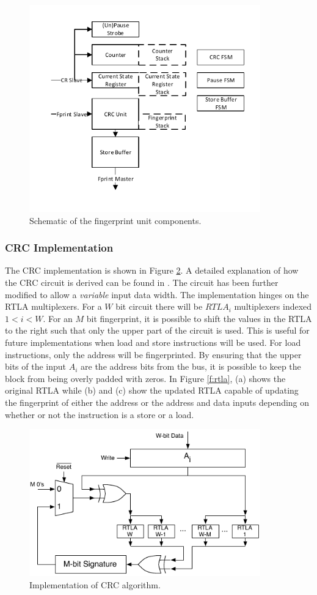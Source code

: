 \begin{figure}[ht]
\centering
\includegraphics[width=10cm]{Figures/fprint_sch}
\caption{Schematic of the fingerprint unit components.}
\label{f:fprint_sch}
\end{figure}


\subsubsection{CRC Implementation}
The CRC implementation is shown in Figure \ref{f:crc}. A detailed explanation of how the CRC circuit is derived can be found in \cite{Hamed:12}. The circuit has been further modified to allow a \emph{variable} input data width. The implementation hinges on the RTLA multiplexers. For a $W$ bit circuit there will be $RTLA_i$ multiplexers indexed $1 < i < W$.
For an $M$ bit fingerprint, it is possible to shift the values in the RTLA to the right such that only the upper part of the circuit is used. This is useful for future implementations when load and store instructions will be used. For load instructions, only the address will be fingerprinted. By ensuring that the upper bits of the input $A_i$ are the address bits from the bus, it is possible to keep the block from being overly padded with zeros. In Figure \ref{f:rtla}, (a) shows the original RTLA while (b) and (c) show the updated RTLA capable of updating the fingerprint of either the address or the address and data inputs depending on whether or not the instruction is a store or a load. 

\begin{figure}[ht]
\centering
\includegraphics[width=10cm]{Figures/crc}
\caption{Implementation of CRC algorithm.}
\label{f:crc}
\end{figure}

